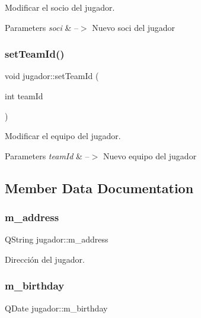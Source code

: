 Modificar el socio del jugador. 


\begin{DoxyParams}{Parameters}
{\em soci} & --$>$ Nuevo soci del jugador \\
\hline
\end{DoxyParams}
\mbox{\label{classjugador_ae853f109166a05c832bb89f84cc7408c}} 
\subsubsection{\texorpdfstring{set\+Team\+Id()}{setTeamId()}}
{\footnotesize\ttfamily void jugador\+::set\+Team\+Id (\begin{DoxyParamCaption}\item[{int}]{team\+Id }\end{DoxyParamCaption})}



Modificar el equipo del jugador. 


\begin{DoxyParams}{Parameters}
{\em team\+Id} & --$>$ Nuevo equipo del jugador \\
\hline
\end{DoxyParams}


\subsection{Member Data Documentation}
\mbox{\label{classjugador_a1b6be8d5abdbf71ab907ba36c67a524f}} 
\subsubsection{\texorpdfstring{m\+\_\+address}{m\_address}}
{\footnotesize\ttfamily Q\+String jugador\+::m\+\_\+address\hspace{0.3cm}{\ttfamily [private]}}

Dirección del jugador. \mbox{\label{classjugador_aacd583397f387472642e9fd4ac140a82}} 
\subsubsection{\texorpdfstring{m\+\_\+birthday}{m\_birthday}}
{\footnotesize\ttfamily Q\+Date jugador\+::m\+\_\+birthday\hspace{0.3cm}{\ttfamily [private]}}

